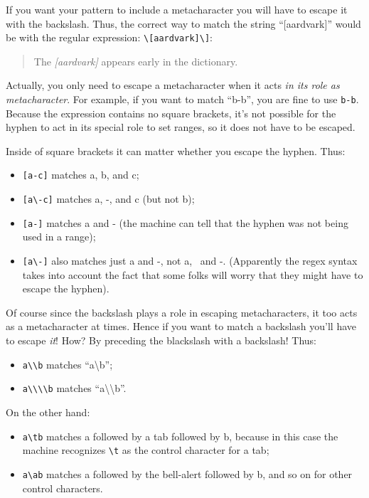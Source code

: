 \documentclass[]{book}
\providecommand{\tightlist}{%
  \setlength{\itemsep}{0pt}\setlength{\parskip}{0pt}}
\theoremstyle{definition}
\theoremstyle{definition}
\theoremstyle{definition}
\theoremstyle{remark}
\begin{document}
{If you want your pattern to include a metacharacter you will have to
escape it with the backslash. Thus, the correct way to match the string
``{[}aardvark{]}'' would be with the regular expression:
\texttt{\textbackslash{}{[}aardvark{]}\textbackslash{}{]}}:

\begin{quote}
The \emph{{[}aardvark{]}} appears early in the dictionary.
\end{quote}

Actually, you only need to escape a metacharacter when it acts \emph{in
its role as metacharacter}. For example, if you want to match ``b-b'',
you are fine to use \texttt{b-b}. Because the expression contains no
square brackets, it's not possible for the hyphen to act in its special
role to set ranges, so it does not have to be escaped.

Inside of square brackets it can matter whether you escape the hyphen.
Thus:

\begin{itemize}
\tightlist
\item
  \texttt{{[}a-c{]}} matches a, b, and c;
\item
  \texttt{{[}a\textbackslash{}-c{]}} matches a, -, and c (but not b);
\item
  \texttt{{[}a-{]}} matches a and - (the machine can tell that the
  hyphen was not being used in a range);
\item
  \texttt{{[}a\textbackslash{}-{]}} also matches just a and -, not a,
  ~and -. (Apparently the regex syntax takes into account the fact that
  some folks will worry that they might have to escape the hyphen).
\end{itemize}

Of course since the backslash plays a role in escaping metacharacters,
it too acts as a metacharacter at times. Hence if you want to match a
backslash you'll have to escape \emph{it}! How? By preceding the
blackslash with a backslash! Thus:

\begin{itemize}
\tightlist
\item
  \texttt{a\textbackslash{}\textbackslash{}b} matches
  ``a\textbackslash{}b'';
\item
  \texttt{a\textbackslash{}\textbackslash{}\textbackslash{}\textbackslash{}b}
  matches ``a\textbackslash{}\textbackslash{}b''.
\end{itemize}

On the other hand:

\begin{itemize}
\tightlist
\item
  \texttt{a\textbackslash{}tb} matches a followed by a tab followed by
  b, because in this case the machine recognizes
  \texttt{\textbackslash{}t} as the control character for a tab;
\item
  \texttt{a\textbackslash{}ab} matches a followed by the bell-alert
  followed by b, and so on for other control characters.
\end{itemize}

}
\end{document}
